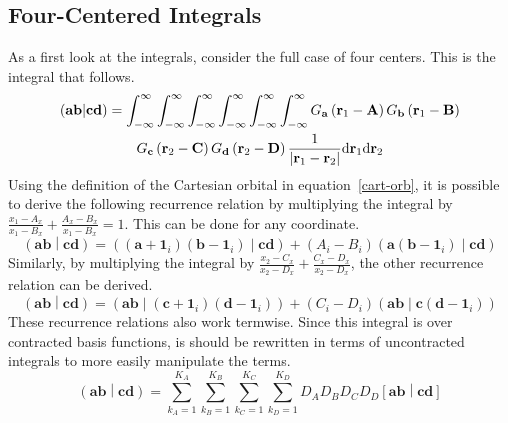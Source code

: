\subsection{Four-Centered Integrals}

As a first look at the integrals, consider the full case of four centers. This is the integral that follows.
\begin{multline}
  \left(\mathbf{ab}\middle|\mathbf{cd}\right) = \int_{-\infty}^\infty\int_{-\infty}^\infty\int_{-\infty}^\infty\int_{-\infty}^\infty\int_{-\infty}^\infty\int_{-\infty}^\infty G_{\mathbf{a}}\left(\mathbf{r}_1 - \mathbf{A}\right)G_{\mathbf{b}}\left(\mathbf{r}_1 - \mathbf{B}\right)\\
  G_{\mathbf{c}}\left(\mathbf{r}_2 - \mathbf{C}\right)G_{\mathbf{d}}\left(\mathbf{r}_2 - \mathbf{D}\right)\frac{1}{\left|\mathbf{r}_1 - \mathbf{r}_2\right|} \mathrm{d}\mathbf{r}_1 \mathrm{d}\mathbf{r}_2
  \label{fc-full-integral}
\end{multline}
Using the definition of the Cartesian orbital in equation~\ref{cart-orb}, it is possible to derive the following recurrence relation by multiplying the integral by $\frac{x_1 - A_x}{x_1 - B_x} + \frac{A_x - B_x}{x_1 - B_x} = 1$. This can be done for any coordinate.
\begin{equation}
  \left(\mathbf{ab}\middle|\mathbf{cd}\right) = \left(\left(\mathbf{a} + \mathbf{1}_i\right)\left(\mathbf{b} - \mathbf{1}_i\right)\middle|\mathbf{cd}\right) + \left(A_i - B_i\right)\left(\mathbf{a}\left(\mathbf{b} - \mathbf{1}_i\right)\middle|\mathbf{cd}\right)
  \label{fc-recur-1}
\end{equation}
Similarly, by multiplying the integral by $\frac{x_2 - C_x}{x_2 - D_x} + \frac{C_x  - D_x}{x_2 - D_x}$, the other recurrence relation can be derived.
\begin{equation}
  \left(\mathbf{ab}\middle|\mathbf{cd}\right) = \left(\mathbf{ab}\middle|\left(\mathbf{c} + \mathbf{1}_i\right)\left(\mathbf{d} - \mathbf{1}_i\right)\right) + \left(C_i - D_i\right)\left(\mathbf{ab}\middle|\mathbf{c}\left(\mathbf{d} - \mathbf{1}_i\right)\right)
  \label{fc-recur-2}
\end{equation}
These recurrence relations also work termwise. Since this integral is over contracted basis functions, is should be rewritten in terms of uncontracted integrals to more easily manipulate the terms.
\begin{equation}
  \left(\mathbf{ab}\middle|\mathbf{cd}\right) = \sum_{k_A = 1}^{K_A}\sum_{k_B = 1}^{K_B}\sum_{k_C = 1}^{K_C}\sum_{k_D = 1}^{K_D} D_A D_B D_C D_D \left[\mathbf{ab}\middle|\mathbf{cd}\right]
\end{equation}
